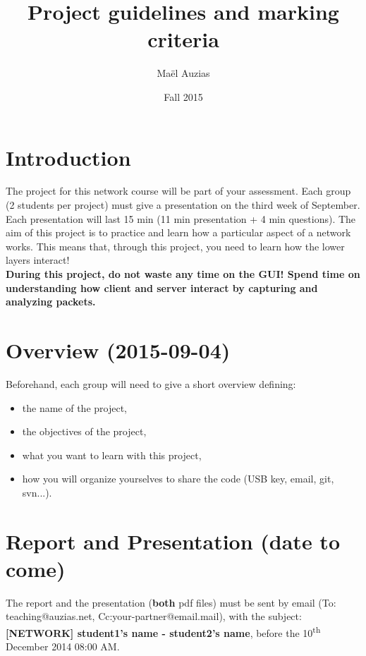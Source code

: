 \documentclass[11pt]{article}
\begin{document}
 
\title{Project guidelines and marking criteria}
\date{Fall 2015}
\author{Maël Auzias}
\maketitle

\section{Introduction}
The project for this network course will be part of your assessment. Each group (2 students per project) must give a presentation on the third week of September. Each presentation will last 15 min (11 min presentation + 4 min questions). The aim of this project is to practice and learn how a particular aspect of a network works. This means that, through this project, you need to learn how the lower layers interact!\\
\textbf{During this project, do not waste any time on the GUI! Spend time on understanding how client and server interact by capturing and analyzing packets.}

\section{Overview (2015-09-04)}
Beforehand, each group will need to give a short overview defining:
  \begin{itemize}
    \item the name of the project,
    \item the objectives of the project,
    \item what you want to learn with this project,
    \item how you will organize yourselves to share the code (USB key, email, git, svn...).
  \end{itemize}

\section{Report and Presentation (date to come)}
The report and the presentation (\textbf{both} pdf files) must be sent by email (To: teaching@auzias.net, Cc:your-partner@email.mail), with the subject: \textbf{[NETWORK] student1's name - student2's name}, before the 10\textsuperscript{th} December 2014 08:00 AM.
\end{document}
